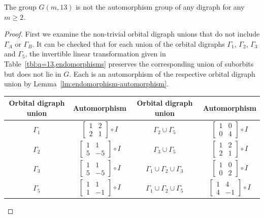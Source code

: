 \documentclass[ALCO, Unicode]{cedram}
\begin{document}
\begin{theorem} \label{thm:q=13}
The group $G{\left(m, 13 \right)}$ is not the automorphism group of any digraph for any $m \geqslant 2$.
\end{theorem}
\begin{proof}
First we examine the non-trivial orbital digraph unions that do not include $\Gamma_A$ or $\Gamma_B$. It can be checked that for each union of the orbital digraphs $\Gamma_1$, $\Gamma_2$, $\Gamma_3$ and $\Gamma_5$, the invertible linear transformation given in Table~\ref{tbl:q=13,endomorphisms} preserves the corresponding union of suborbits but does not lie in $G$. Each is an automorphism of the respective orbital digraph union by Lemma~\ref{lm:endomorphism-automorphism}.

\begin{table}
\centering
\begin{tabular}{cc||cc}
\hline
Orbital digraph union & Automorphism & Orbital digraph union & Automorphism \\
\hline
\vphantom{\Bigg(} $\Gamma_1$ & $\begin{bmatrix} 1 & 2 \\ 2 & 1 \end{bmatrix} \circ I$ & $\Gamma_2 \cup \Gamma_5$ & $\begin{bmatrix} 1 & 0 \\ 0 & 4 \end{bmatrix} \circ I$ \\
\vphantom{\Bigg(} $\Gamma_2$ & $\begin{bmatrix} 1 & 1 \\ 5 & -5 \end{bmatrix} \circ I$ & $\Gamma_3 \cup \Gamma_5$ & $\begin{bmatrix} 1 & 2 \\ 2 & 1 \end{bmatrix} \circ I$ \\
\vphantom{\Bigg(} $\Gamma_3$ & $\begin{bmatrix} 1 & 1 \\ 5 & -5 \end{bmatrix} \circ I$ & $\Gamma_1 \cup \Gamma_2 \cup \Gamma_3$ & $\begin{bmatrix} 1 & 0 \\ 0 & 2 \end{bmatrix} \circ I$ \\
\vphantom{\Bigg(} $\Gamma_5$ & $\begin{bmatrix} 1 & 1 \\ 1 & -1 \end{bmatrix} \circ I$ & $\Gamma_1 \cup \Gamma_2 \cup \Gamma_5$ & $\begin{bmatrix} 1 & 4 \\ 4 & -1 \end{bmatrix} \circ I$ \\

\end{tabular}
\end{table}
\end{proof}
\end{document}
